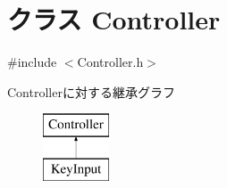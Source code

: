 \hypertarget{class_controller}{\section{クラス Controller}
\label{class_controller}
}


{\ttfamily \#include $<$Controller.\-h$>$}

Controllerに対する継承グラフ\begin{figure}[H]
\begin{center}
\leavevmode
\includegraphics[height=2.000000cm]{d8/d87/class_controller}
\end{center}
\end{figure}
